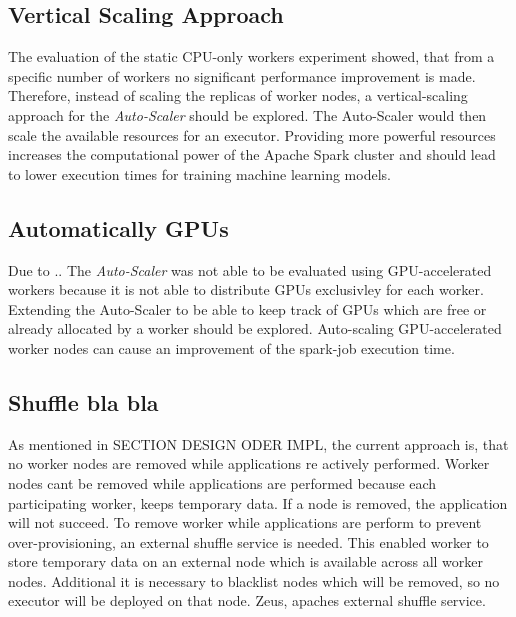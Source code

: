 \subsection{Vertical Scaling Approach}
The evaluation of the static CPU-only workers experiment showed, that from a specific number of workers no significant performance improvement is made.
Therefore, instead of scaling the replicas of worker nodes, a vertical-scaling approach for the \textit{Auto-Scaler} should be explored. The Auto-Scaler would then scale the available resources for an executor.
Providing more powerful resources increases the computational power of the Apache Spark cluster and should lead to lower execution times for training machine learning models.


\subsection{Automatically GPUs}
\label{subsec:08_outlook_gpus}
Due to ..
The \textit{Auto-Scaler} was not able to be evaluated using GPU-accelerated workers because it is not able to distribute GPUs exclusivley for each worker.
Extending the Auto-Scaler to be able to keep track of GPUs which are free or already allocated by a worker should be explored.
%
Auto-scaling GPU-accelerated worker nodes can cause an improvement of the spark-job execution time.


\subsection{Shuffle bla bla}
As mentioned in SECTION DESIGN ODER IMPL, the current approach is, that no worker nodes are removed while applications re actively performed.
Worker nodes cant be removed while applications are performed because each participating worker, keeps temporary data. If a node is removed, the application will not succeed.
%
To remove worker while applications are perform to prevent over-provisioning, an external shuffle service is needed. This enabled worker to store temporary data on an external node which is available across all worker nodes.
Additional it is necessary to blacklist nodes which will be removed, so no executor will be deployed on that node.
%
Zeus, apaches external shuffle service.
